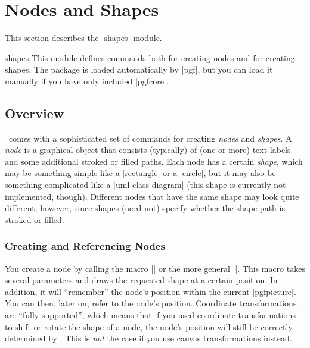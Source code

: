 %
%
%


\section{Nodes and Shapes}

\label{section-shapes}

This section describes the |shapes| module.

\begin{pgfmodule}{shapes}
    This module defines commands both for creating nodes and for creating
    shapes. The package is loaded automatically by |pgf|, but you can load it
    manually if you have  only included |pgfcore|.
\end{pgfmodule}


\subsection{Overview}

\pgfname\ comes with a sophisticated set of commands for creating \emph{nodes}
and \emph{shapes}. A \emph{node} is a graphical object that consists
(typically) of (one or more) text labels and some additional stroked or filled
paths. Each node has a certain \emph{shape}, which may be something simple like
a |rectangle| or a |circle|, but it may also be something complicated like a
|uml class diagram| (this shape is currently not implemented, though).
Different nodes that have the same shape may look quite different, however,
since shapes (need not) specify whether the shape path is stroked or filled.


\subsubsection{Creating and Referencing Nodes}

You create a node by calling the macro |\pgfnode| or the more general
|\pgfmultipartnode|. This macro takes several parameters and draws the
requested shape at a certain position. In addition, it will ``remember'' the
node's position within the current |{pgfpicture}|. You can then, later on,
refer to the node's position. Coordinate transformations are ``fully
supported'', which means that if you used coordinate transformations to shift
or rotate the shape of a node, the node's position will still be correctly
determined by \pgfname. This is \emph{not} the case if you use canvas
transformations instead.


